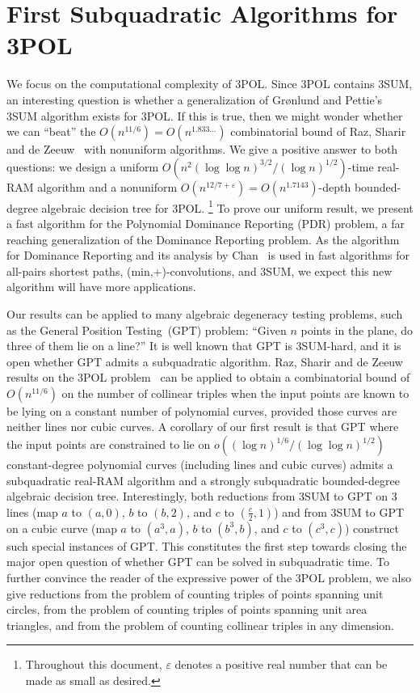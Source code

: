 \section{First Subquadratic Algorithms for 3POL}
We focus on the computational complexity of 3POL\@. Since 3POL contains 3SUM,
an interesting question is whether a generalization of Gr\o nlund and Pettie's
3SUM algorithm exists for 3POL\@. If this is true, then we might wonder whether
we can ``beat'' the $O(n^{11/6}) = O(n^{1.833\ldots})$ combinatorial bound of Raz,
Sharir and de Zeeuw~\cite{RSZ15} with nonuniform algorithms. We give a positive
answer to both questions: we design
a uniform
$O(n^2 {(\log \log n)}^{3/2} / {(\log n)}^{1/2})$-time
real-RAM algorithm
and
a nonuniform
$O(n^{12/7+\varepsilon}) = O(n^{1.7143})$-depth
bounded-degree algebraic decision tree
for 3POL\@.%
\footnote{Throughout this document, $\varepsilon$ denotes a positive real
number that can be made as small as desired.}
To prove our uniform result, we present a fast algorithm for the Polynomial
Dominance Reporting (PDR) problem, a far reaching generalization of the
Dominance Reporting problem. As the algorithm for Dominance Reporting and its
analysis by Chan~\cite{Cha08} is used in fast algorithms for all-pairs shortest
paths, (min,+)-convolutions, and 3SUM, we expect this new algorithm will have
more applications.

Our results can be applied to many algebraic degeneracy testing problems, such
as the General Position Testing~(GPT) problem: ``Given $n$ points in the plane, do
three of them lie on a line?'' It is well known that GPT is 3SUM-hard,
and it is open whether GPT admits a subquadratic algorithm. Raz, Sharir
and de Zeeuw results on the 3POL problem~\cite{RSZ15} can be applied to obtain
a combinatorial bound of $O(n^{11/6})$ on the
number of collinear triples when the input points are known to be lying on
a constant number of polynomial curves, provided those curves are neither
lines nor cubic curves. A corollary of our first result is that
GPT where the input points are constrained to lie on
$o({(\log n)}^{1/6}/{(\log \log n)}^{1/2})$
constant-degree polynomial curves (including lines and cubic curves)
admits a subquadratic real-RAM algorithm and
a strongly subquadratic bounded-degree algebraic decision tree.
Interestingly, both reductions from 3SUM to GPT on 3 lines (map $a$ to $(a,0)$,
$b$ to $(b,2)$, and $c$ to $(\frac c2, 1)$) and from 3SUM to GPT on a
cubic curve (map $a$ to $(a^3,a)$, $b$ to $(b^3,b)$, and $c$ to $(c^3,c)$)
construct such special instances of GPT\@.
This constitutes the first step towards closing the major open question of
whether GPT can be solved in subquadratic time.
%
To further convince the reader of the expressive power of the 3POL problem,
we also give reductions from the problem of counting triples of points spanning
unit circles, from the problem of counting triples of points spanning unit area
triangles, and from the problem of counting collinear triples in any dimension.

